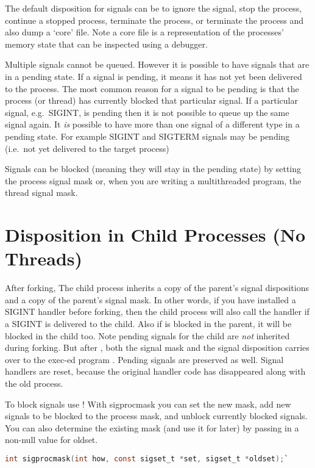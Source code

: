 The default disposition for signals can be to ignore the signal, stop the process, continue a stopped process, terminate the process, or terminate the process and also dump a `core' file. Note a core file is a representation of the processes' memory state that can be inspected using a debugger.

Multiple signals cannot be queued. However it is possible to have signals that are in a pending state. If a signal is pending, it means it has not yet been delivered to the process. The most common reason for a signal to be pending is that the process (or thread) has currently blocked that particular signal. If a particular signal, e.g.~SIGINT, is pending then it is not possible to queue up the same signal again. It \emph{is} possible to have more than one signal of a different type in a pending state. For example SIGINT and SIGTERM signals may be pending (i.e.~not yet delivered to the target process)

Signals can be blocked (meaning they will stay in the pending state) by setting the process signal mask or, when you are writing a multithreaded program, the thread signal mask.

\section{Disposition in Child Processes (No Threads)}

After forking, The child process inherits a copy of the parent's signal dispositions and a copy of the parent's signal mask. In other words, if you have installed a SIGINT handler before forking, then the child process will also call the handler if a SIGINT is delivered to the child. Also if  is blocked in the parent, it will be blocked in the child too. Note pending signals for the child are \emph{not} inherited during forking. But after , both the signal mask and the signal disposition carries over to the exec-ed program \cite{execute}. Pending signals are preserved as well. Signal handlers are reset, because the original handler code has disappeared along with the old process.

To block signals use ! With sigprocmask you can set the new mask, add new signals to be blocked to the process mask, and unblock currently blocked signals. You can also determine the existing mask (and use it for later) by passing in a non-null value for oldset.

\begin{lstlisting}[language=C]
int sigprocmask(int how, const sigset_t *set, sigset_t *oldset);`
\end{lstlisting}

